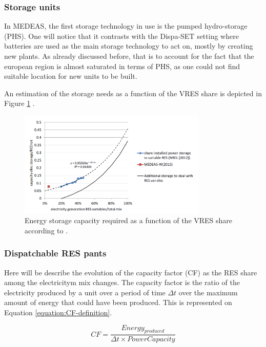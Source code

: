 \subsubsection{Storage units}

In MEDEAS, the first storage technology in use is the pumped hydro-storage (PHS). One will notice that it contrasts with the Dispa-SET setting where batteries are used as the main storage technology to act on, mostly by creating new plants. As already discussed before, that is to account for the fact that the european region is almost saturated in terms of PHS, as one could not find suitable location for new units to be built.

An estimation of the storage needs as a function of the VRES share is depicted in Figure \ref{fig:storage-vres} \cite{NREL}.

\begin{figure}[h]
    \includegraphics[width=0.8\textwidth]{resources/images/storage.png}
    \caption{Energy storage capacity required as a function of the VRES share according to \cite{NREL}.}
    \label{fig:storage-vres}
\end{figure}

\subsubsection{Dispatchable RES pants}

Here will be describe the evolution of the capacity factor (CF) as the RES share among the electricitym mix changes. The capacity factor is the ratio of the electricity produced by a unit over a period of time $\Delta t$ over the maximum amount of energy that could have been produced. This is represented on Equation \ref{equation:CF-definition}.


\begin{equation}
    CF = \frac{Energy_{produced}}{\Delta t \times PowerCapacity}
    \label{equation:CF-definition}
\end{equation}

